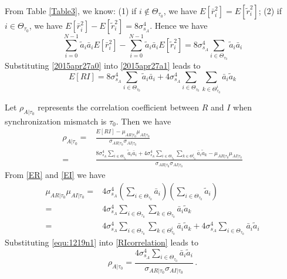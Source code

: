  From Table \ref{Table3}, we know: (1) if $i \notin \Theta_{\tau_0}$, we have $E[\bar{r}_i^2] = E[\tilde{r}_i^2]$; (2) if $i \in \Theta_{\tau_0}$, we have $E[\bar{r}_i^2] -  E[\tilde{r}_i^2] = 8\sigma_{s_A}^4$. Hence we have 
 \begin{equation}
   \sum_{i=0}^{N-1}\tilde{a}_i\bar{a}_iE[\bar{r}_i^2] - \sum_{i=0}^{N-1}\tilde{a}_i\bar{a}_iE[\tilde{r}_i^2] = 
8\sigma_{s_A}^4\sum_{i\in \Theta_{\tau_0}}\tilde{a}_i\bar{a}_i
   \label{2015apr27a0}
 \end{equation}
 Substituting \eqref{2015apr27a0} into \eqref{2015apr27a1} leads to 
 \begin{equation}
   E[RI] = 8\sigma_{s_A}^4\sum_{i\in \Theta_{\tau_0}}\tilde{a}_i\bar{a}_i+ 4\sigma_{s_A}^4\sum_{i\in\Theta_{\tau_0}}\sum_{k\in\Theta_{\tau_0}^i}\bar{a}_i\tilde{a}_k
   \label{ERI2015apr27}
 \end{equation}

Let $\rho_{A|\tau_0}$ represents the correlation coefficient between $R$ and $I$ when synchronization mismatch is $\tau_0$. Then we have
\begin{equation}
  \begin{split}
	\rho_{A|\tau_0} = &\frac{E[RI]-\mu_{AR|\tau_0}\mu_{AI|\tau_0}}{\sigma_{AR|\tau_0}\sigma_{AI|\tau_0}}\\
	= &\frac{8\sigma_{s_A}^4\sum_{i\in \Theta_{\tau_0}}\tilde{a}_i\bar{a}_i + 4\sigma_{s_A}^4\sum_{i\in\Theta_{\tau_0}}\sum_{k\in\Theta_{\tau_0}^i}\bar{a}_i\tilde{a}_k - \mu_{AR|\tau_0}\mu_{AI|\tau_0}}{\sigma_{AR|\tau_0}\sigma_{AI|\tau_0}}
  \end{split}
  \label{RIcorrelation}
\end{equation}
From \eqref{ER} and \eqref{EI} we have 
\begin{equation}
  \begin{split}
  \mu_{AR|\tau_0}\mu_{AI|\tau_0} = &4\sigma_{s_A}^4(\sum_{i\in\Theta_{\tau_0}}\bar{a}_i)(\sum_{i\in\Theta_{\tau_0}}\tilde{a}_i)\\
  = &4\sigma_{s_A}^4\sum_{i\in\Theta_{\tau_0}}\sum_{k\in\Theta_{\tau_0}}\bar{a}_i\tilde{a}_k\\
  = &4\sigma_{s_A}^4\sum_{i\in\Theta_{\tau_0}}\sum_{k\in\Theta_{\tau_0}^i}\bar{a}_i\tilde{a}_k + 4\sigma_{s_A}^4\sum_{i\in\Theta_{\tau_0}}\bar{a}_i\tilde{a}_i
\end{split}
  \label{equ:1219n1}
\end{equation}
Substituting \eqref{equ:1219n1} into \eqref{RIcorrelation} leads to 
\begin{equation}
  \rho_{A|\tau_0}= \frac{4\sigma_{s_A}^4\sum_{i\in\Theta_{\tau_0}}\bar{a}_i\tilde{a}_i}{\sigma_{AR|\tau_0}\sigma_{AI|\tau_0}}\,.
  \label{ERI2}
\end{equation}
 

